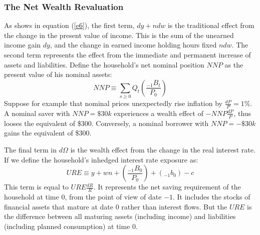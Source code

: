 \documentclass[11pt,letterpaper]{article}
\begin{document}
\subsubsection{The Net Wealth Revaluation}
As shows in equation (\ref{e6}), the first term, $dy + ndw$ is the traditional effect from the change in the present value of income. This is the sum of the unearned income gain $dy$, and the change in earned income holding hours fixed $ndw$. The second term represents the effect from the immediate and permanent increase of assets and liabilities. Define the household's net nominal position $NNP$ as the present value of his nominal assets: 
\begin{equation*}
	NNP \equiv \sum_{s \geqslant 0} Q_{t} \left(\frac{_{-1}B_{t}}{P_{0}}\right)
\end{equation*}
Suppose for example that nominal prices unexpectedly rise inflation by $\frac{dP}{P} = 1\%$. A nominal saver with $NNP = \$30k$ experiences a wealth effect of $-NNP\frac{dP}{P}$, thus looses the equivalent of \$300. Conversely, a nominal borrower with $NNP = -\$30k$ gains the equivalent of \$300. 

The final term in $d\Omega$ is the wealth effect from the change in the real interest rate. If we define the household's inhedged interest rate exposure as: 
\begin{equation*}
	URE \equiv y + wn + \left(\frac{_{-1}B_{0}}{P_{0}}\right) + (_{-1}b_{0}) -c 
\end{equation*}
This term is equal to $URE\frac{dR}{R}$. It represents the net saving requirement of the household at time $0$, from the point of view of date $-1$. It includes the stocks of financial assets that mature at date $0$ rather than interest flows. But the $URE$ is the difference between all maturing assets (including income) and liabilities (including planned consumption) at time $0$.  
\iffalse 
\begin{equation*}
	\sum_{t \geqslant 1}q_{t}(y_{t} + w_{t}n_{t}) + \sum_{t \geqslant 1}q_{t}\left((_{-1}b_{t}) + \left(\frac{_{-1}B_{t}}{P_{t}}\right)\right) - \sum_{t \geqslant 1}q_{t}c_{t} = -URE
\end{equation*}
}
\fi
\end{document}
